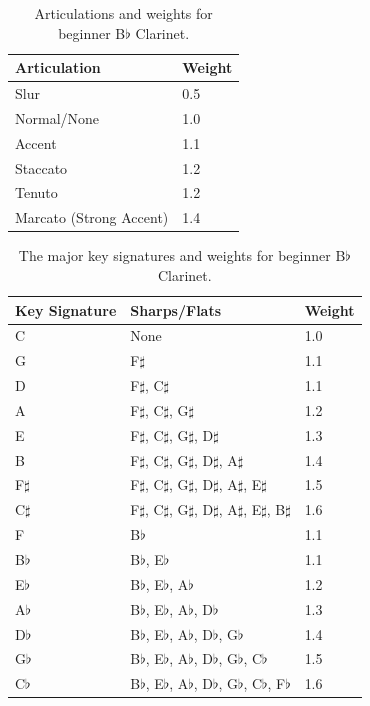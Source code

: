 \documentclass[12pt]{report}
\begin{document}
\begin{table}
	\centering
	\caption{Articulations and weights for beginner B$\flat$ Clarinet.}
    \begin{tabular}{| l | l |}
        \hline
        Articulation & Weight \\ \hline
        Slur & 0.5 \\ \hline
        Normal/None & 1.0 \\ \hline
        Accent & 1.1 \\ \hline
        Staccato & 1.2 \\ \hline
        Tenuto & 1.2 \\ \hline
        Marcato (Strong Accent) & 1.4 \\
        \hline
    \end{tabular}
	\label{table:articulations}
\end{table}

\begin{table}
	\centering
	\caption{The major key signatures and weights for beginner B$\flat$ Clarinet.}
    \begin{tabular}{| l | l | l |}
        \hline
        Key Signature & Sharps/Flats & Weight \\ \hline
        C & None & 1.0 \\ \hline
        G & F$\sharp$ & 1.1 \\ \hline 
        D & F$\sharp$, C$\sharp$ & 1.1 \\ \hline
        A & F$\sharp$, C$\sharp$, G$\sharp$ & 1.2 \\ \hline
        E & F$\sharp$, C$\sharp$, G$\sharp$, D$\sharp$ & 1.3 \\ \hline
        B & F$\sharp$, C$\sharp$, G$\sharp$, D$\sharp$, A$\sharp$ & 1.4 \\ \hline
        F$\sharp$ & F$\sharp$, C$\sharp$, G$\sharp$, D$\sharp$, A$\sharp$, E$\sharp$ & 1.5 \\ \hline
        C$\sharp$ & F$\sharp$, C$\sharp$, G$\sharp$, D$\sharp$, A$\sharp$, E$\sharp$, B$\sharp$ & 1.6 \\ \hline
        F & B$\flat$ & 1.1 \\ \hline
        B$\flat$ & B$\flat$, E$\flat$ & 1.1 \\ \hline
        E$\flat$ & B$\flat$, E$\flat$, A$\flat$ & 1.2 \\ \hline
        A$\flat$ & B$\flat$, E$\flat$, A$\flat$, D$\flat$ & 1.3 \\ \hline
        D$\flat$ & B$\flat$, E$\flat$, A$\flat$, D$\flat$, G$\flat$ & 1.4 \\ \hline
        G$\flat$ & B$\flat$, E$\flat$, A$\flat$, D$\flat$, G$\flat$, C$\flat$ & 1.5 \\ \hline
        C$\flat$ & B$\flat$, E$\flat$, A$\flat$, D$\flat$, G$\flat$, C$\flat$, F$\flat$ & 1.6 \\
        \hline
    \end{tabular}
	\label{table:key}
\end{table}
\end{document}
